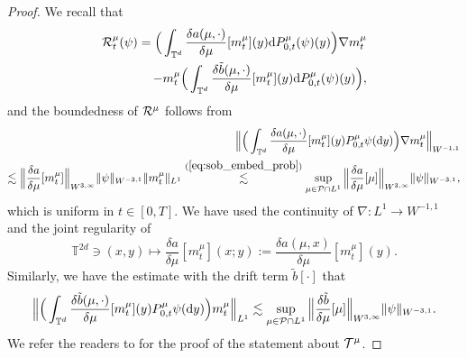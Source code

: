 \begin{proof}
We recall that 
\begin{equation*}
\begin{split}
    \mathcal{R}^{\mu}_t(\psi) =  \Big(\int_{\mathbb{T}^d}\frac{\delta a(\mu, \cdot)}{\delta\mu}[m_t^{\mu}](y)\mathrm{d}P^{\mu}_{0,t} (\psi)(y) \Big)\nabla m^{\mu}_t \\
 - m^{\mu}_t   \Big(\int_{\mathbb{T}^d}\frac{\delta \tilde{b}(\mu, \cdot)}{\delta\mu}[m_t^{\mu}](y)\mathrm{d}P^{\mu}_{0,t} (\psi)(y)\Big),
\end{split}
\end{equation*}
and the boundedness of $\mathcal{R}^{\mu}$ follows from 
\begin{align*}
\Big\|\Big(\int_{\mathbb{T}^d}\frac{\delta a(\mu, \cdot)}{\delta\mu}[m_t^{\mu}](y)P^{\mu}_{0,t} \psi (\mathrm{d}y) \Big)\nabla m^{\mu}_t\Big\|_{W^{-1,1}}\\
\lesssim \Big\|\frac{\delta a}{\delta\mu}[m_t^{\mu}]\Big\|_{W^{3,\infty}} \|\psi\|_{W^{-3,1}}\|m_t^{\mu}\|_{L^1}
\overset{(\ref{eq:sob_embed_prob})}{\lesssim} \sup_{\mu \in \mathcal{P} \cap L^1} \Big\|\frac{\delta a}{\delta\mu}[\mu]\Big\|_{W^{3,\infty}} \|\psi\|_{W^{-3,1}},
\end{align*}
which is uniform in $t \in [0,T]$. We have used the continuity of $\nabla: L^1 \to W^{-1,1}$ and the joint regularity of 
\[
\mathbb{T}^{2d} \ni (x,y) \mapsto \frac{\delta a}{\delta\mu}[m_t^{\mu}](x;y) := \frac{\delta a(\mu, x)}{\delta\mu}[m_t^{\mu}](y).
\]
Similarly, we have the estimate with the drift term $\tilde{b}[\cdot]$ that
\begin{align*}
\Big\|\Big(\int_{\mathbb{T}^d}\frac{\delta \tilde{b}(\mu, \cdot)}{\delta\mu}[m_t^{\mu}](y)P^{\mu}_{0,t} \psi (\mathrm{d}y) \Big) m^{\mu}_t\Big\|_{L^{1}} \lesssim \sup_{\mu \in \mathcal{P} \cap L^1} \Big\|\frac{\delta \tilde{b}}{\delta\mu}[\mu]\Big\|_{W^{3,\infty}} \|\psi\|_{W^{-3,1}}.
\end{align*} 
We refer the readers to \cite[Lemma A.8]{djurdjevac2025weak} for the proof of the statement about $\mathcal{T}^{\mu}$.
\end{proof}